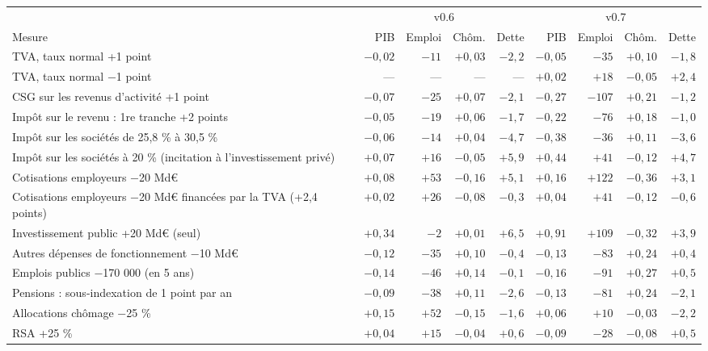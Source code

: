 \begin{tabular}{p{6.2cm}rrrr|rrrr}\toprule & \multicolumn{4}{c|}{v0.6} & \multicolumn{4}{c}{v0.7}\\ Mesure & PIB & Emploi & Chôm. & Dette & PIB & Emploi & Chôm. & Dette\\ \midrule
TVA, taux normal +1 point & $-0{,}02$ & $-11$ & $+0{,}03$ & $-2{,}2$ & $-0{,}05$ & $-35$ & $+0{,}10$ & $-1{,}8$\\
TVA, taux normal −1 point & --- & --- & --- & --- & $+0{,}02$ & $+18$ & $-0{,}05$ & $+2{,}4$\\
CSG sur les revenus d'activité +1 point & $-0{,}07$ & $-25$ & $+0{,}07$ & $-2{,}1$ & $-0{,}27$ & $-107$ & $+0{,}21$ & $-1{,}2$\\
Impôt sur le revenu : 1re tranche +2 points & $-0{,}05$ & $-19$ & $+0{,}06$ & $-1{,}7$ & $-0{,}22$ & $-76$ & $+0{,}18$ & $-1{,}0$\\
Impôt sur les sociétés de 25,8 \% à 30,5 \% & $-0{,}06$ & $-14$ & $+0{,}04$ & $-4{,}7$ & $-0{,}38$ & $-36$ & $+0{,}11$ & $-3{,}6$\\
Impôt sur les sociétés à 20 \% (incitation à l'investissement privé) & $+0{,}07$ & $+16$ & $-0{,}05$ & $+5{,}9$ & $+0{,}44$ & $+41$ & $-0{,}12$ & $+4{,}7$\\
Cotisations employeurs −20 Md€ & $+0{,}08$ & $+53$ & $-0{,}16$ & $+5{,}1$ & $+0{,}16$ & $+122$ & $-0{,}36$ & $+3{,}1$\\
Cotisations employeurs −20 Md€ financées par la TVA (+2,4 points) & $+0{,}02$ & $+26$ & $-0{,}08$ & $-0{,}3$ & $+0{,}04$ & $+41$ & $-0{,}12$ & $-0{,}6$\\
Investissement public +20 Md€ (seul) & $+0{,}34$ & $-2$ & $+0{,}01$ & $+6{,}5$ & $+0{,}91$ & $+109$ & $-0{,}32$ & $+3{,}9$\\
Autres dépenses de fonctionnement −10 Md€ & $-0{,}12$ & $-35$ & $+0{,}10$ & $-0{,}4$ & $-0{,}13$ & $-83$ & $+0{,}24$ & $+0{,}4$\\
Emplois publics −170 000 (en 5 ans) & $-0{,}14$ & $-46$ & $+0{,}14$ & $-0{,}1$ & $-0{,}16$ & $-91$ & $+0{,}27$ & $+0{,}5$\\
Pensions : sous-indexation de 1 point par an & $-0{,}09$ & $-38$ & $+0{,}11$ & $-2{,}6$ & $-0{,}13$ & $-81$ & $+0{,}24$ & $-2{,}1$\\
Allocations chômage −25 \% & $+0{,}15$ & $+52$ & $-0{,}15$ & $-1{,}6$ & $+0{,}06$ & $+10$ & $-0{,}03$ & $-2{,}2$\\
RSA +25 \% & $+0{,}04$ & $+15$ & $-0{,}04$ & $+0{,}6$ & $-0{,}09$ & $-28$ & $-0{,}08$ & $+0{,}5$\\

\end{tabular}
